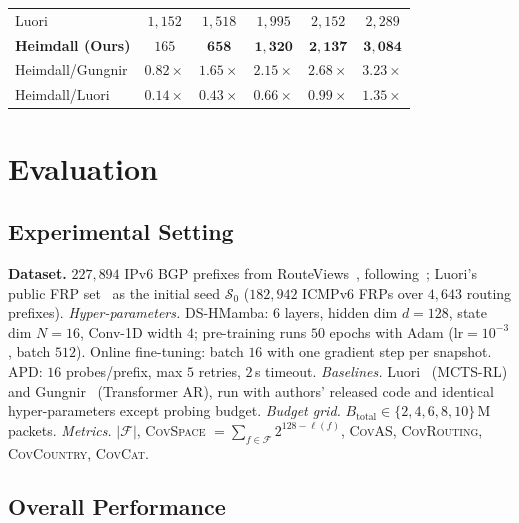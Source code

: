 \documentclass[conference]{IEEEtran}
\begin{document}
\begin{table}[t]
\begin{minipage}{0.54\linewidth}
\begin{tabular}{lccccc}
Luori   & $1{,}152$ & $1{,}518$ & $1{,}995$ & $2{,}152$ & $2{,}289$\\
\textbf{Heimdall (Ours)} & $165$ & $\mathbf{658}$ & $\mathbf{1{,}320}$ & $\mathbf{2{,}137}$ & $\mathbf{3{,}084}$\\
\midrule
Heimdall/Gungnir & $0.82\!\times$ & $1.65\!\times$ & $2.15\!\times$ & $2.68\!\times$ & $\mathbf{3.23\!\times}$\\
Heimdall/Luori   & $0.14\!\times$ & $0.43\!\times$ & $0.66\!\times$ & $0.99\!\times$ & $\mathbf{1.35\!\times}$\\
\bottomrule
\end{tabular}
\end{minipage}
\end{table}


\section{Evaluation}\label{sec:eval}

\subsection{Experimental Setting}\label{sec:eval:setup}
\textbf{Dataset.}  $227{,}894$ IPv6 BGP prefixes from
RouteViews~\cite{routeviews}, following~\cite{wei2025gungnir};
Luori's public FRP set~\cite{cheng2024luori} as the initial
seed $\mathcal{S}_0$ ($182{,}942$ ICMPv6 FRPs over $4{,}643$
routing prefixes).
\emph{Hyper-parameters.}  DS-HMamba: $6$ layers, hidden dim $d{=}128$,
state dim $N{=}16$, Conv-1D width $4$; pre-training runs $50$
epochs with Adam ($\text{lr}{=}10^{-3}$, batch $512$).  Online
fine-tuning: batch $16$ with one gradient step per snapshot.
APD: $16$ probes/prefix, max $5$ retries, $2$\,s timeout.
\emph{Baselines.}  Luori~\cite{cheng2024luori} (MCTS-RL) and
Gungnir~\cite{wei2025gungnir} (Transformer AR), run with
authors' released code and identical hyper-parameters except
probing budget.
\emph{Budget grid.} $B_{\text{total}}\!\in\!\{2,4,6,8,10\}$\,M
packets.
\emph{Metrics.} $|\mathcal{F}|$, \textsc{CovSpace}
$=\!\sum_{f\in\mathcal{F}}2^{128-\ell(f)}$, \textsc{CovAS},
\textsc{CovRouting}, \textsc{CovCountry}, \textsc{CovCat}.

\subsection{Overall Performance}\label{sec:eval:perf}
\end{document}
